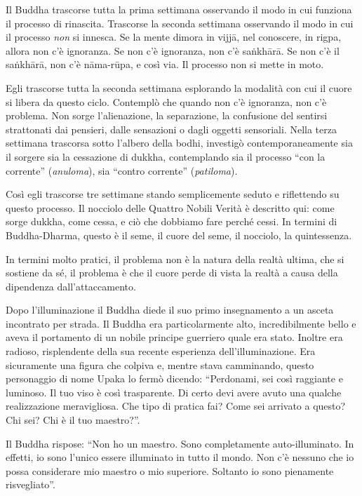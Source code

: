 Il Buddha trascorse tutta la prima settimana osservando il modo in cui funziona il processo di rinascita. Trascorse la seconda settimana osservando il modo in cui il processo \textit{non} si innesca. Se la mente dimora in vijjā, nel conoscere, in rigpa, allora non c'è ignoranza. Se non c'è ignoranza, non c'è saṅkhārā. Se non c'è il saṅkhārā, non c'è nāma-rūpa, e così via. Il processo non si mette in moto. 

Egli trascorse tutta la seconda settimana esplorando la modalità con cui il cuore si libera da questo ciclo. Contemplò che quando non c'è ignoranza, non c'è problema. Non sorge l'alienazione, la separazione, la confusione del sentirsi strattonati dai pensieri, dalle sensazioni o dagli oggetti sensoriali. Nella terza settimana trascorsa sotto l'albero della bodhi, investigò contemporaneamente sia il sorgere sia la cessazione di dukkha, contemplando sia il processo ``con la corrente'' (\textit{anuloma}), sia ``contro corrente'' (\textit{patiloma}).

Così egli trascorse tre settimane stando semplicemente seduto e riflettendo su questo processo. Il nocciolo delle Quattro Nobili Verità è descritto qui: come sorge dukkha, come cessa, e ciò che dobbiamo fare perché cessi. In termini di Buddha-Dharma, questo è il seme, il cuore del seme, il nocciolo, la quintessenza.

In termini molto pratici, il problema non è la natura della realtà ultima, che si sostiene da sé, il problema è che il cuore perde di vista la realtà a causa della dipendenza dall'attaccamento.

Dopo l'illuminazione il Buddha diede il suo primo insegnamento a un asceta incontrato per strada. Il Buddha era particolarmente alto, incredibilmente bello e aveva il portamento di un nobile principe guerriero quale era stato. Inoltre era radioso, risplendente della sua recente esperienza dell'illuminazione. Era sicuramente una figura che colpiva e, mentre stava camminando, questo personaggio di nome Upaka lo fermò dicendo: ``Perdonami, sei così raggiante e luminoso. Il tuo viso è così trasparente. Di certo devi avere avuto una qualche realizzazione meravigliosa. Che tipo di pratica fai? Come sei arrivato a questo? Chi sei? Chi è il tuo maestro?''.

Il Buddha rispose: ``Non ho un maestro. Sono completamente auto-illuminato. In effetti, io sono l'unico essere illuminato in tutto il mondo. Non c'è nessuno che io possa considerare mio maestro o mio superiore. Soltanto io sono pienamente risvegliato''.


